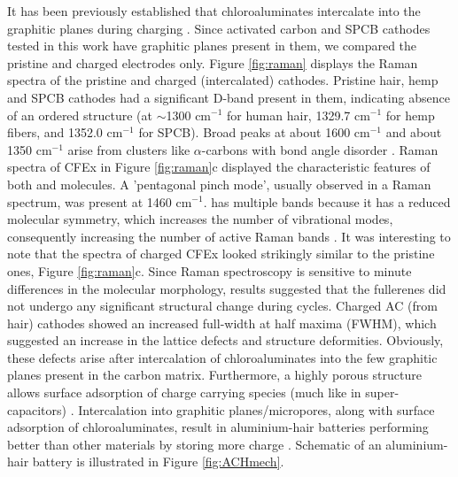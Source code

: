 \documentclass{article}
\begin{document}
It has been previously established that chloroaluminates intercalate into the graphitic planes during charging \cite{lin_ultrafast_2015-3}. Since activated carbon and SPCB cathodes tested in this work have graphitic planes present in them, we compared the pristine and charged electrodes only. Figure \ref{fig:raman} displays the Raman spectra of the pristine and charged (intercalated) cathodes. Pristine hair, hemp and SPCB cathodes had a significant D-band present in them, indicating absence of an ordered structure (at $\sim$1300 cm$^{-1}$ for human hair, 1329.7 cm$^{-1}$ for hemp fibers, and 1352.0 cm$^{-1}$ for SPCB). Broad peaks at about 1600 cm$^{-1}$ and about 1350 cm$^{-1}$ arise from  clusters like $\alpha$-carbons with bond angle disorder \cite{shimo}. Raman spectra of CFEx in Figure \ref{fig:raman}c displayed the characteristic features of both  and  molecules. A 'pentagonal pinch mode', usually observed in a  Raman spectrum, was present at 1460 cm$^{-1}$.  has multiple bands because it has a reduced molecular symmetry, which increases the number of vibrational modes, consequently increasing the number of active Raman bands \cite{kimbrell_analysis_2014}. It was interesting to note that the spectra of charged CFEx looked strikingly similar to the pristine ones, Figure \ref{fig:raman}c. Since Raman spectroscopy is sensitive to minute differences in the molecular morphology, results suggested that the fullerenes did not undergo any significant structural change during cycles. Charged AC (from hair) cathodes showed an increased full-width at half maxima (FWHM), which suggested an increase in the lattice defects and structure deformities. Obviously, these defects arise after intercalation of chloroaluminates into the few graphitic planes present in the carbon matrix. Furthermore, a highly porous structure allows surface adsorption of charge carrying species (much like in super-capacitors) \cite{beguin_carbons_2014}. Intercalation into graphitic planes/micropores, along with surface adsorption of chloroaluminates, result in aluminium-hair batteries performing better than other materials by storing more charge \cite{brezesinski_ordered_2010}. Schematic of an aluminium-hair battery is illustrated in Figure \ref{fig:ACHmech}.
\end{document}
